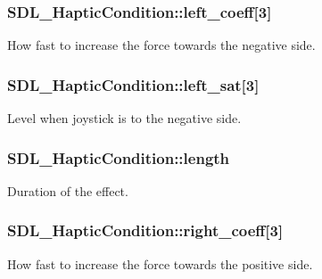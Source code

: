 \subsubsection[{left\+\_\+coeff}]{ S\+D\+L\+\_\+\+Haptic\+Condition\+::left\+\_\+coeff\mbox{[}3\mbox{]}}\label{struct_s_d_l___haptic_condition_a2adf52c32f60f0b6826b1e3add2eae7a}
How fast to increase the force towards the negative side. \hypertarget{struct_s_d_l___haptic_condition_a953448774c40818a4f47c6efea21124d}{}
\subsubsection[{left\+\_\+sat}]{ S\+D\+L\+\_\+\+Haptic\+Condition\+::left\+\_\+sat\mbox{[}3\mbox{]}}\label{struct_s_d_l___haptic_condition_a953448774c40818a4f47c6efea21124d}
Level when joystick is to the negative side. \hypertarget{struct_s_d_l___haptic_condition_ad0efb0a6ddc20f058e87199eaaa95978}{}
\subsubsection[{length}]{ S\+D\+L\+\_\+\+Haptic\+Condition\+::length}\label{struct_s_d_l___haptic_condition_ad0efb0a6ddc20f058e87199eaaa95978}
Duration of the effect. \hypertarget{struct_s_d_l___haptic_condition_a3de7f164ef88841255535387d0f100b6}{}
\subsubsection[{right\+\_\+coeff}]{ S\+D\+L\+\_\+\+Haptic\+Condition\+::right\+\_\+coeff\mbox{[}3\mbox{]}}\label{struct_s_d_l___haptic_condition_a3de7f164ef88841255535387d0f100b6}
How fast to increase the force towards the positive side. \hypertarget{struct_s_d_l___haptic_condition_a90427a1e0d464b4b53abc1d419c97b2e}{}
